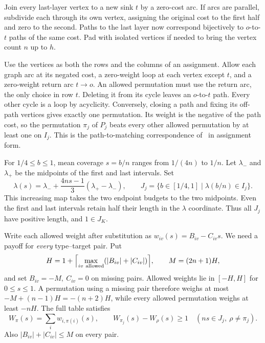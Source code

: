 \documentclass[11pt,letterpaper]{article}
\theoremstyle{definition}
\begin{document}
Join every last-layer vertex to a new sink \(t\) by a zero-cost arc. If
arcs are parallel, subdivide each through its own vertex, assigning the
original cost to the first half and zero to the second. Paths to the last
layer now correspond bijectively to \(o\)-to-\(t\) paths of the same cost.
Pad with isolated vertices if needed to bring the vertex count \(n\) up to \(h\).

Use the vertices as both the rows and the columns of an assignment. Allow
each graph arc at its negated cost, a zero-weight loop at each vertex
except \(t\), and a zero-weight return arc \(t\to o\). An allowed
permutation must use the return arc, the only choice in row \(t\).
Deleting it from its cycle leaves an \(o\)-to-\(t\) path. Every other
cycle is a loop by acyclicity. Conversely, closing a path and fixing its
off-path vertices gives exactly one permutation. Its weight is the
negative of the path cost, so the permutation \(\pi_j\) of \(P_j\) beats
every other allowed permutation by at least one on \(I_j\). This is the
path-to-matching correspondence of~\cite[Appendix~B]{GR} in assignment form.

For \(1/4\le b\le1\), mean coverage \(s=b/n\) ranges from \(1/(4n)\) to
\(1/n\). Let \(\lambda_-\) and \(\lambda_+\) be the midpoints of the first
and last intervals. Set
\begin{equation}
  \lambda(s)=\lambda_-+\frac{4ns-1}{3}(\lambda_+-\lambda_-),\qquad
  J_j=\{b\in[1/4,1]\mid\lambda(b/n)\in I_j\}.
  \label{eq:rescale}
\end{equation}
This increasing map takes the two endpoint budgets to the two midpoints.
Even the first and last intervals retain half their length in the
\(\lambda\) coordinate. Thus all \(J_j\) have positive length, and
\(1\in J_K\).

Write each allowed weight after substitution as \(w_{iv}(s)=B_{iv}-C_{iv}s\).
We need a payoff for \emph{every} type--target pair. Put
\[
  H=1+\Bigl\lceil\max_{iv\ \mathrm{allowed}}(|B_{iv}|+|C_{iv}|)\Bigr\rceil,
  \qquad M=(2n+1)H,
\]
and set \(B_{iv}=-M,\ C_{iv}=0\) on missing pairs. Allowed weights lie
in \([-H,H]\) for \(0\le s\le1\). A permutation using a missing pair
therefore weighs at most \(-M+(n-1)H=-(n+2)H\), while every allowed
permutation weighs at least \(-nH\). The full table satisfies
\begin{equation}
  W_\pi(s)=\sum_i w_{i,\pi(i)}(s),\qquad
  W_{\pi_j}(s)-W_\rho(s)\ge1
  \quad (ns\in J_j,\ \rho\ne\pi_j).
  \label{eq:gap}
\end{equation}
Also \(|B_{iv}|+|C_{iv}|\le M\) on every pair.
\end{document}
